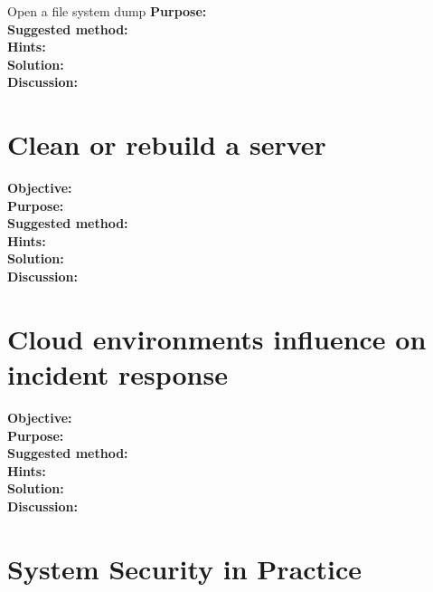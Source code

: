 \documentclass[a4paper,11pt,notitlepage]{report}
\begin{document}
 Open a file system dump
{\bf Purpose:}\\


{\bf Suggested method:}\\


{\bf Hints:}\\


{\bf Solution:}\\


{\bf Discussion:}\\



\chapter{Clean or rebuild a server}
\label{ex:clean-or-rebuild}

{\bf Objective:}\\


{\bf Purpose:}\\


{\bf Suggested method:}\\


{\bf Hints:}\\


{\bf Solution:}\\


{\bf Discussion:}\\


\chapter{Cloud environments influence on incident response}
\label{ex:cloud-incident-response}

{\bf Objective:}\\


{\bf Purpose:}\\


{\bf Suggested method:}\\


{\bf Hints:}\\


{\bf Solution:}\\


{\bf Discussion:}\\





\chapter{System Security in Practice}
\label{ex:system-security-practice}
\end{document}
